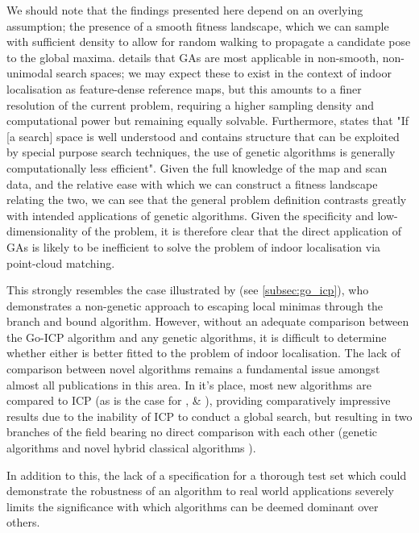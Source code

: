 \documentclass[authoryearcitations]{UoYCSproject}
\begin{document}
We should note that the findings presented here depend on an overlying assumption; the presence of a smooth fitness landscape, which we can sample with sufficient density to allow for random walking to propagate a candidate pose to the global maxima. \citet{Mitchell1998-td} details that GAs are most applicable in non-smooth, non-unimodal search spaces; we may expect these to exist in the context of indoor localisation as feature-dense reference maps, but this amounts to a finer resolution of the current problem, requiring a higher sampling density and computational power but remaining equally solvable. Furthermore,\citet{Grefenstette2012-ir} states that "If [a search] space is well understood and contains structure that can be exploited by special purpose search techniques, the use of genetic algorithms is generally computationally less efficient". Given the full knowledge of the map and scan data, and the relative ease with which we can construct a fitness landscape relating the two, we can see that the general problem definition contrasts greatly with intended applications of genetic algorithms. Given the specificity and low-dimensionality of the problem, it is therefore clear that the direct application of GAs is likely to be inefficient to solve the problem of indoor localisation via point-cloud matching. \newline

This strongly resembles the case illustrated by \citeauthor{Yang2013-gx} (see \autoref{subsec:go_icp}), who demonstrates a non-genetic approach to escaping local minimas through the branch and bound algorithm. However, without an adequate comparison between the Go-ICP algorithm and any genetic algorithms, it is difficult to determine whether either is better fitted to the problem of indoor localisation. The lack of comparison between novel algorithms remains a fundamental issue amongst almost all publications in this area. In it's place, most new algorithms are compared to ICP (as is the case for \cite{Lenac2007-xm}, \cite{Lomonosov2006-vq} \& \cite{Yang2013-gx}), providing comparatively impressive results due to the inability of ICP to conduct a global search, but resulting in two branches of the field bearing no direct comparison with each other (genetic algorithms \cite{Lenac2007-xm} \cite{Lenac2011-co} \cite{Ze-Su2007-li} and novel hybrid classical algorithms \cite{Yang2013-gx} \cite{Ma2016-es}).  \newline

In addition to this, the lack of a specification for a thorough test set which could demonstrate the robustness of an algorithm to real world applications severely limits the significance with which algorithms can be deemed dominant over others. \newline
\end{document}
